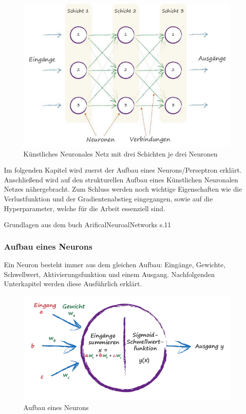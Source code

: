 \begin{figure}[htb]
  \centering  
  \includegraphics[scale=0.5]{img/S36_Buildyourown.png}
  \caption{Künstliches Neuronales Netz mit drei Schichten je drei Neuronen \cite{Rashid2017} }
  \label{fig:neural_network}
\end{figure}


Im folgenden Kapitel wird zuerst der Aufbau eines Neurons/Perseptron erklärt. Anschließend wird auf den strukturellen Aufbau eines Künstlichen Neuronalen Netzes nähergebracht. Zum Schluss werden noch wichtige Eigenschaften wie die Verlustfunktion und der Gradientenabstieg eingegangen, sowie auf die Hyperparameter, welche für die Arbeit essenziell sind.



Grundlagen aus dem buch ArificalNeuroalNetworks s.11 


\subsubsection{Aufbau eines Neurons}
Ein Neuron besteht immer aus dem gleichen Aufbau: Eingänge, Gewichte, Schwellwert, Aktivierungsfunktion und einem Ausgang.
Nachfolgenden Unterkapitel werden diese Ausführlich erklärt.
\begin{figure}[htb]
  \centering  
  \includegraphics[scale=0.5]{img/S41_Buildyourown.png}
  \caption{Aufbau eines Neurons \cite{Rashid2017}}
  \label{fig:neuron}
\end{figure}





